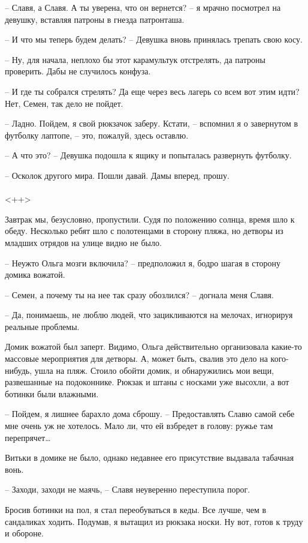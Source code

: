\documentclass[a4paper]{book}
\begin{document}
-- Славя, а Славя. А ты уверена, что он вернется? -- я мрачно посмотрел на девушку, вставляя патроны в гнезда патронташа.  

-- И что мы теперь будем делать? -- Девушка вновь принялась трепать свою косу.

-- Ну, для начала, неплохо бы этот карамультук отстрелять, да патроны проверить. Дабы не случилось конфуза.  

-- И где ты собрался стрелять? Да еще через весь лагерь со всем вот этим идти? Нет, Семен, так дело не пойдет.

-- Ладно. Пойдем, я свой рюкзачок заберу. Кстати, -- вспомнил я о завернутом в футболку лаптопе, -- это, пожалуй, здесь оставлю. 

-- А что это? -- Девушка подошла к ящику и попыталась развернуть футболку. 

-- Осколок другого мира. Пошли давай. Дамы вперед, прошу.

\paragraph{}<++>


Завтрак мы, безусловно, пропустили. Судя по положению солнца, время шло к обеду. Несколько ребят шло с полотенцами в сторону пляжа, но детворы из младших отрядов на улице видно не было. 

-- Неужто Ольга мозги включила? -- предположил я, бодро шагая в сторону домика вожатой. 

-- Семен, а почему ты на нее так сразу обозлился? -- догнала меня Славя. 

-- Да, понимаешь, не люблю людей, что зацикливаются на мелочах, игнорируя реальные проблемы. 

Домик вожатой был заперт. Видимо, Ольга действительно организовала какие-то массовые мероприятия для детворы. А, может быть, свалив это дело на кого-нибудь, ушла на пляж. Стоило обойти домик, и обнаружились мои вещи, развешанные на подоконнике. Рюкзак и штаны с носками уже высохли, а вот ботинки были влажными. 

-- Пойдем, я лишнее барахло дома сброшу. -- Предоставлять Славю самой себе мне очень уж не хотелось. Мало ли, что ей взбредет в голову: ружье там перепрячет\ldots

Витьки в домике не было, однако недавнее его присутствие выдавала табачная вонь.

-- Заходи, заходи не маячь, -- Славя неуверенно переступила порог. 

Бросив ботинки на пол, я стал переобуваться в кеды. Все лучше, чем в сандаликах ходить. Подумав, я вытащил из рюкзака носки. Ну вот, готов к труду и обороне. 
\end{document}
